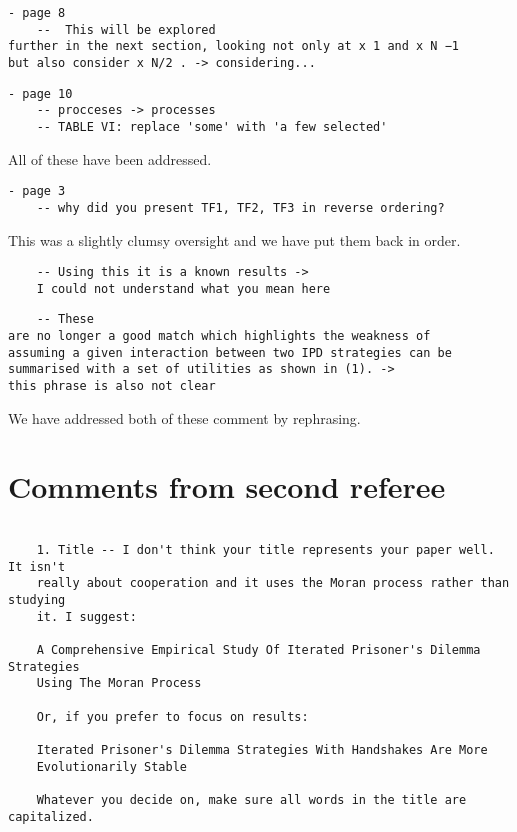 \documentclass[a4]{article}
\begin{document}
\begin{verbatim}
- page 8
	--  This will be explored
further in the next section, looking not only at x 1 and x N −1
but also consider x N/2 . -> considering...
\end{verbatim}

\begin{verbatim}
- page 10
	-- procceses -> processes
	-- TABLE VI: replace 'some' with 'a few selected'
\end{verbatim}

All of these have been addressed. 

\begin{verbatim}
- page 3
	-- why did you present TF1, TF2, TF3 in reverse ordering?
\end{verbatim}

This was a slightly clumsy oversight and we have put them back in order.

\begin{verbatim}
	-- Using this it is a known results -> 
    I could not understand what you mean here
\end{verbatim}

\begin{verbatim}
	-- These
are no longer a good match which highlights the weakness of
assuming a given interaction between two IPD strategies can be
summarised with a set of utilities as shown in (1). -> 
this phrase is also not clear
\end{verbatim}

We have addressed both of these comment by rephrasing.

\section{Comments from second referee}

\begin{verbatim}

    1. Title -- I don't think your title represents your paper well. It isn't
    really about cooperation and it uses the Moran process rather than studying
    it. I suggest: 

    A Comprehensive Empirical Study Of Iterated Prisoner's Dilemma Strategies
    Using The Moran Process

    Or, if you prefer to focus on results:

    Iterated Prisoner's Dilemma Strategies With Handshakes Are More
    Evolutionarily Stable

    Whatever you decide on, make sure all words in the title are capitalized.

\end{verbatim}
\end{document}

